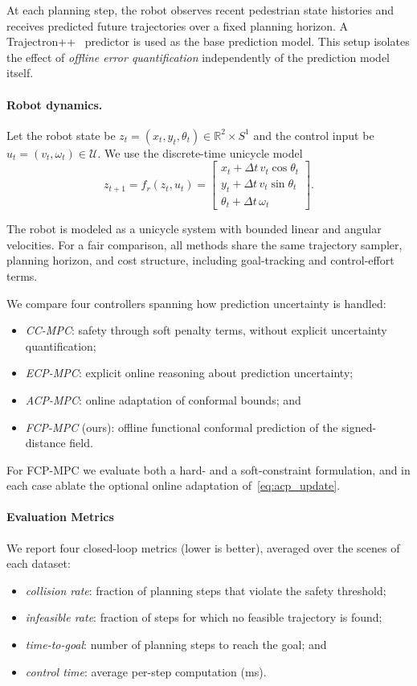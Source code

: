 \documentclass[lettersize,journal]{IEEEtran}
\begin{document}
At each planning step, the robot observes recent pedestrian state histories and
receives predicted future trajectories over a fixed planning horizon.
A Trajectron++~\cite{salzmann2020trajectron}
predictor is used as the base prediction model.
This setup isolates the effect of \emph{offline error quantification}
independently of the prediction model itself.

\paragraph{Robot dynamics.}
Let the robot state be $z_t=(x_t,y_t,\theta_t)\in\mathbb R^2\times S^1$ and the control input be
$u_t=(v_t,\omega_t)\in\mathcal U$.
We use the discrete-time unicycle model
\[
z_{t+1}=f_r(z_t,u_t)
=
\begin{bmatrix}
x_t+\Delta t\,v_t\cos\theta_t\\
y_t+\Delta t\,v_t\sin\theta_t\\
\theta_t+\Delta t\,\omega_t
\end{bmatrix}.
\]

The robot is modeled as a unicycle system with bounded linear and angular velocities.
For a fair comparison, all methods share the same trajectory sampler, planning
horizon, and cost structure, including goal-tracking and control-effort terms.

We compare four controllers spanning how prediction uncertainty is handled:
\begin{itemize}
\item \emph{CC-MPC}: safety through soft penalty terms, without explicit uncertainty quantification;
\item \emph{ECP-MPC}: explicit online reasoning about prediction uncertainty;
\item \emph{ACP-MPC}: online adaptation of conformal bounds; and
\item \emph{FCP-MPC} (ours): offline functional conformal prediction of the signed-distance field.
\end{itemize}
For FCP-MPC we evaluate both a hard- and a soft-constraint formulation, and in each
case ablate the optional online adaptation of~\eqref{eq:acp_update}.



\paragraph{Evaluation Metrics}
We report four closed-loop metrics (lower is better), averaged over the scenes of
each dataset:
\begin{itemize}
\item \emph{collision rate}: fraction of planning steps that violate the safety threshold;
\item \emph{infeasible rate}: fraction of steps for which no feasible trajectory is found;
\item \emph{time-to-goal}: number of planning steps to reach the goal; and
\item \emph{control time}: average per-step computation (ms).
\end{itemize}
\end{document}
